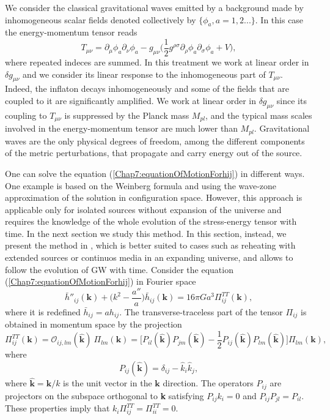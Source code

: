 \documentclass[11pt,a4paper,twoside]{book}
\begin{document}
We consider the classical gravitational waves emitted by a background made by inhomogeneous scalar fields denoted collectively by $ \{\phi_{a},a=1,2...\} $. In this case the energy-momentum tensor reads
\begin{equation}
\label{Chap7:EnergyMomentumTensor}
T_{\mu\nu}=\partial_{\mu}\phi_{a}\partial_{\nu}\phi_{a} - g_{\mu\nu}\Bigg(\frac{1}{2}g^{\rho\sigma}\partial_{\rho}\phi_{a}\partial_\sigma \phi_{a} + V \Bigg),
\end{equation}
where repeated indeces are summed. In this treatment we work at linear order in $ \delta g_{\mu\nu} $ and we consider its linear response to the inhomogeneous part of $ T_{\mu\nu} $. Indeed, the inflaton decays inhomogeneously and some of the fields that are coupled to it are significantly amplified. We work at linear order in $\delta g_{\mu\nu}$ since its coupling to $ T_{\mu\nu} $ is suppressed by the Planck mass $ M_{pl} $, and the typical mass scales involved in the energy-momentum tensor are much lower than $ M_{pl} $. Gravitational waves are the only physical degrees of freedom, among the different components of the metric perturbations, that propagate and carry energy out of the source.

One can solve the equation (\ref{Chap7:equationOfMotionForhij}) in different ways. One example is based on the Weinberg formula and using the wave-zone approximation of the solution in configuration space. However, this approach is applicable only for isolated sources without expansion of the universe and requires the knowledge of the whole evolution of the stress-energy tensor with time. In the next section we study this method. In this section, instead, we present the method in \cite{Chap7:GreenMethod}, which is better suited to cases such as reheating with extended sources or continuos media in an expanding universe, and allows to follow the evolution of GW with time.
Consider the equation (\ref{Chap7:equationOfMotionForhij}) in Fourier space
\begin{equation}
	\label{Chap7:EquationGWFourierSpace}
	\bar{h}''_{ij}(\textbf{k}) + \Bigg(k^{2}-\frac{a''}{a}\Bigg)\bar{h}_{ij}(\textbf{k}) = 16\pi Ga^{3}\Pi^{TT}_{ij}(\textbf{k}),
\end{equation}
where it is redefined $ \bar{h}_{ij}=ah_{ij} $. The transverse-traceless part of the tensor $ \Pi_{ij} $ is obtained in momentum space by the projection
\begin{equation}
\label{Chap7:transverseTracelessProjection}
\Pi^{TT}_{ij}(\textbf{k})=\mathcal{O}_{ij,lm}(\hat{\textbf{k}})\ \Pi_{lm}(\textbf{k})= \Biggl[P_{il}(\hat{\textbf{k}})P_{jm}(\hat{\textbf{k}}) - \frac{1}{2}P_{ij}(\hat{\textbf{k}})P_{lm}(\hat{\textbf{k}})\Biggr] \Pi_{lm}(\textbf{k}),
\end{equation}
where
\begin{equation}
\label{Chap7:ProjectionOperator}
P_{ij}(\hat{\textbf{k}})=\delta_{ij}-\hat{k}_{i}\hat{k}_{j},
\end{equation}
where $ \hat{\textbf{k}}=\textbf{k}/k $ is the unit vector in the $ \textbf{k} $ direction. The operators $ P_{ij} $ are projectors on the subspace orthogonal to \textbf{k} satisfying $ P_{ij}k_{i}=0 $ and $ P_{ij}P_{jl}=P_{il} $. These properties imply that $ k_{i}\Pi^{TT}_{ij} = \Pi^{TT}_{ii}=0. $
\end{document}
